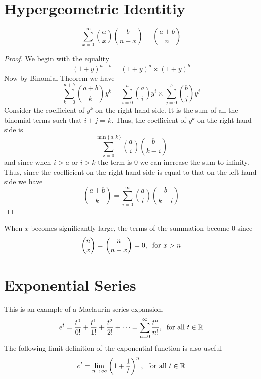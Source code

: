 \section{Hypergeometric Identitiy}
\[
    \sum_{x = 0}^{\infty} \binom{a}{x} \binom{b}{n-x} = \binom{a + b}{n}
\]
\begin{proof}
We begin with the equality
\[
    (1 + y)^{a + b} = (1 + y)^a \times (1 + y)^b
\]
Now by Binomial Theorem we have
\[
    \sum_{k = 0}^{a + b} \binom{a + b}{k} y^k = \sum_{i = 0}^{a} \binom{a}{i} y^i \times \sum_{j = 0}^{b} \binom{b}{j} y^j
\]
Consider the coefficient of $y^k$ on the right hand side. It is the sum of all the binomial terms such that $i + j = k$. Thus, the coefficient of $y^k$ on the right hand side is
\[
    \sum_{i = 0}^{\min\{\, a,k \,\}} \binom{a}{i} \binom{b}{k-i}
\]
and since when $i > a$ or $i > k$ the term is 0 we can increase the sum to infinity. Thus, since the coefficient on the right hand side is equal to that on the left hand side we have
\[
    \binom{a + b}{k} = \sum_{i = 0}^{\infty} \binom{a}{i} \binom{b}{k-i}
\]
\end{proof}
\begin{info}
When $x$ becomes significantly large, the terms of the summation become 0 since 
\[
    \binom{n}{x} = \binom{n}{n-x} = 0,\:\text{ for } x > n
\]
\end{info}
\section{Exponential Series}
This is an example of a Maclaurin series expansion.
\[
    e^t = \frac{t^0}{0!} + \frac{t^1}{1!} + \frac{t^2}{2!} + \cdots = \sum_{n = 0}^{\infty} \frac{t^n}{n!},\:\text{ for }\text{all } t\in\mathbb{R}
\]
The following limit definition of the exponential function is also useful
\[
    e^t = \lim_{n \rightarrow \infty}\left(1 + \frac{1}{t}\right)^n,\:\text{ for }\text{all } t\in\mathbb{R}
\]